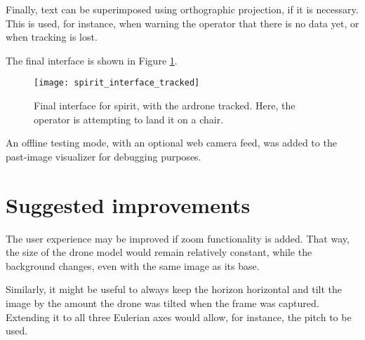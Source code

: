     Finally, text can be superimposed using orthographic projection, if it is necessary.
    This is used, for instance, when warning the operator that there is no data yet, or when tracking is lost.

    The final interface is shown in Figure \ref{fig:spirit_interface_tracked}.

    \begin{figure}[h]
      \centering
      \texttt{[image: spirit\_interface\_tracked]}
      \caption[SPIRIT final interface]{Final interface for \gls{spirit}, with the \gls{ardrone} tracked. Here, the operator is attempting to land it on a chair.}
      \label{fig:spirit_interface_tracked}
    \end{figure}
    
    An offline testing mode, with an optional web camera feed, was added to the past-image visualizer for debugging purposes.


  \section{Suggested improvements}
    The user experience may be improved if zoom functionality is added.
    That way, the size of the drone model would remain relatively constant, while the background changes, even with the same image as its base.
    
    Similarly, it might be useful to always keep the horizon horizontal and tilt the image by the amount the drone was tilted when the frame was captured.
    Extending it to all three Eulerian axes would allow, for instance, the pitch to be used.
